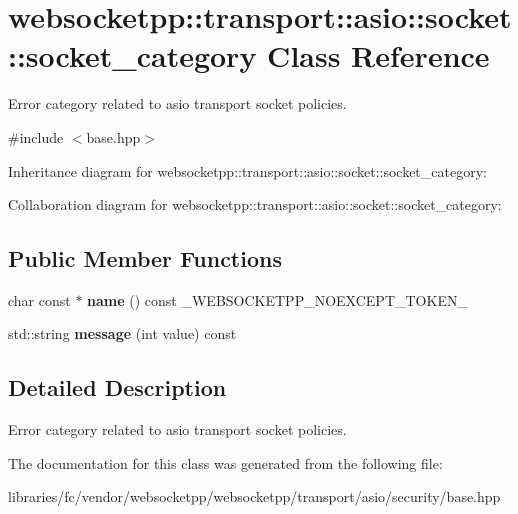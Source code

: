 \hypertarget{classwebsocketpp_1_1transport_1_1asio_1_1socket_1_1socket__category}{}\section{websocketpp\+:\+:transport\+:\+:asio\+:\+:socket\+:\+:socket\+\_\+category Class Reference}
\label{classwebsocketpp_1_1transport_1_1asio_1_1socket_1_1socket__category}


Error category related to asio transport socket policies.  




{\ttfamily \#include $<$base.\+hpp$>$}



Inheritance diagram for websocketpp\+:\+:transport\+:\+:asio\+:\+:socket\+:\+:socket\+\_\+category\+:


Collaboration diagram for websocketpp\+:\+:transport\+:\+:asio\+:\+:socket\+:\+:socket\+\_\+category\+:
\subsection*{Public Member Functions}
\begin{DoxyCompactItemize}
\item 
\mbox{\label{classwebsocketpp_1_1transport_1_1asio_1_1socket_1_1socket__category_aae34251fd85287d7acc17a7ed6a5c79e}} 
char const  $\ast$ {\bfseries name} () const \+\_\+\+W\+E\+B\+S\+O\+C\+K\+E\+T\+P\+P\+\_\+\+N\+O\+E\+X\+C\+E\+P\+T\+\_\+\+T\+O\+K\+E\+N\+\_\+
\item 
\mbox{\label{classwebsocketpp_1_1transport_1_1asio_1_1socket_1_1socket__category_ad1896d95678feb6dbbd43ecea14b19d9}} 
std\+::string {\bfseries message} (int value) const
\end{DoxyCompactItemize}


\subsection{Detailed Description}
Error category related to asio transport socket policies. 

The documentation for this class was generated from the following file\+:\begin{DoxyCompactItemize}
\item 
libraries/fc/vendor/websocketpp/websocketpp/transport/asio/security/base.\+hpp\end{DoxyCompactItemize}

